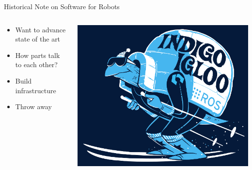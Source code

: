 \documentclass[aspectratio=43]{beamer}
\begin{document}
\begin{frame}{Historical Note on Software for Robots}
\begin{columns}
	\begin{column}{0.55\textwidth}
		\begin{itemize}
			\item Want to advance state of the art
                        \item How parts talk to each other?
                        \item Build infrastructure
			\item Throw away 
		\end{itemize} \end{column} \begin{column}{0.45\textwidth} \centering \includegraphics[width=\textwidth]{fig/indigoigloo_600.png} \end{column}
\end{columns}

\end{frame}
\end{document}
